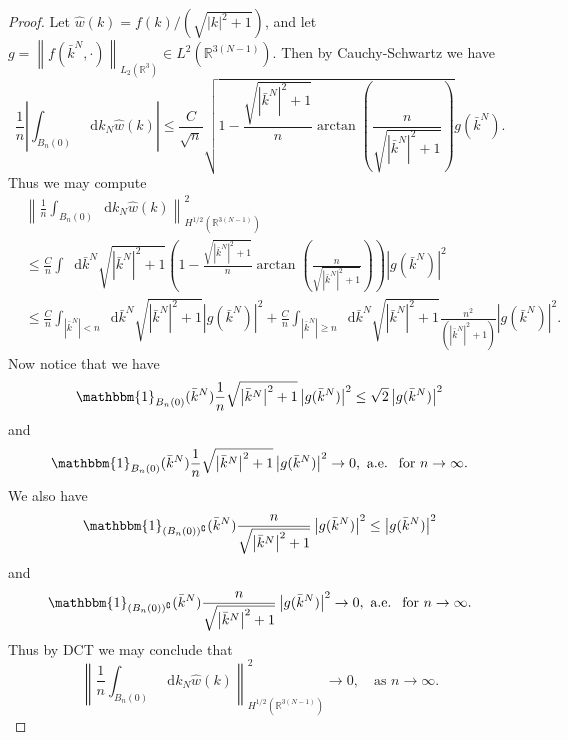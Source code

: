 \documentclass[a4paper,11pt]{article}
\newcommand{\norm}[1]{\left\lVert #1 \right\rVert}
\newcommand{\abs}[1]{\left\lvert #1 \right\rvert}
\newcommand*\diff{\mathop{}\!\mathrm{d}}
\newcommand{\R}{\mathbb{R}}
\numberwithin{equation}{section}
\begin{document}
\begin{proof}
	Let $ \hat{w}(k)=f(k)/(\sqrt{\abs{k}^2+1}) $, and let $ g=\norm{f(\bar{k}^N,\cdot)}_{L_2(\R^3)}\in L^2(\R^{3(N-1)}) $. Then by Cauchy-Schwartz we have
	\begin{equation}
	\frac{1}{n}\left\lvert\int_{B_n(0)}\diff k_N\hat{w}(k)\right\rvert\leq\frac{C}{\sqrt{n}} \sqrt{1-\frac{\sqrt{\abs{\bar{k}^N}^2+1}}{n}\arctan\left(\frac{n}{\sqrt{\abs{\bar{k}^N}^2+1}}\right)}g(\bar{k}^N).
	\end{equation}
	Thus we may compute \begin{equation}
	\begin{aligned}
	&\norm{\frac{1}{n}\int_{B_n(0)}\diff k_N\hat{w}(k)}_{H^{1/2}(\R^{3(N-1)})}^2\\&\leq\frac{C}{n}\int\diff \bar{k}^N\sqrt{\abs{\bar{k}^N}^2+1}\left(1-\frac{\sqrt{\abs{\bar{k}^N}^2+1}}{n}\arctan\left(\frac{n}{\sqrt{\abs{\bar{k}^N}^2+1}}\right)\right)\abs{g(\bar{k}^N)}^2\\&
	\leq\frac{C}{n}\int_{\abs{\bar{k}^N}<n}\diff\bar{k}^N\sqrt{\abs{\bar{k}^N}^2+1}\abs{g(\bar{k}^N)}^2+\frac{C}{n}\int_{\abs{\bar{k}^N}\geq n}\diff \bar{k}^N \sqrt{\abs{\bar{k}^N}^2+1}\frac{n^2}{(\abs{\bar{k}^N}^2+1)}\abs{g(\bar{k}^N)}^2.
	\end{aligned}
	\end{equation}
	Now notice that we have \begin{equation}
	\mathbbm{1}_{B_n(0)}(\bar{k}^N)\frac{1}{n}\sqrt{\abs{\bar{k}^N}^2+1}\abs{g(\bar{k}^N)}^2\leq\sqrt{2}\abs{g(\bar{k}^N)}^2
	\end{equation}
	and \begin{equation}
	\mathbbm{1}_{B_n(0)}(\bar{k}^N)\frac{1}{n}\sqrt{\abs{\bar{k}^N}^2+1}\abs{g(\bar{k}^N)}^2\to0,\ \text{a.e. }\text{ for }n\to\infty.
	\end{equation}
	We also have \begin{equation}
	\mathbbm{1}_{(B_n(0))^\complement}(\bar{k}^N)\frac{n}{\sqrt{\abs{\bar{k}^N}^2+1}}\abs{g(\bar{k}^N)}^2\leq\abs{g(\bar{k}^N)}^2
	\end{equation}
	and \begin{equation}
	\mathbbm{1}_{(B_n(0))^\complement}(\bar{k}^N)\frac{n}{\sqrt{\abs{\bar{k}^N}^2+1}}\abs{g(\bar{k}^N)}^2\to0,\ \text{a.e. }\text{ for }n\to\infty.
	\end{equation}
	Thus by DCT we may conclude that \begin{equation}
	\norm{\frac{1}{n}\int_{B_n(0)}\diff k_N\hat{w}(k)}_{H^{1/2}(\R^{3(N-1)})}^2\to 0,\quad \text{as }n\to\infty.
	\end{equation}
\end{proof}
\end{document}
